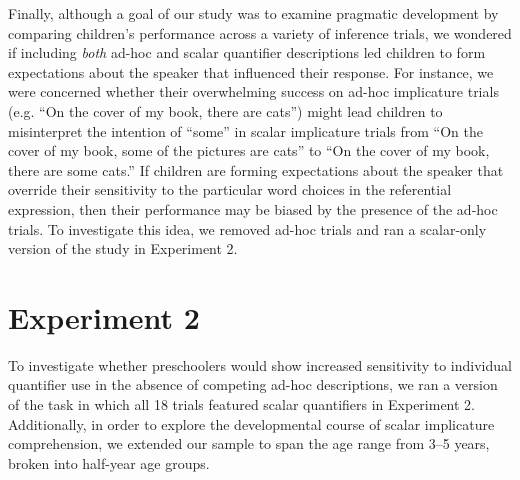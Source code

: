 \documentclass[10pt,letterpaper]{article}
\begin{document}

Finally, although a goal of our study was to examine pragmatic development by comparing children's performance across a variety of inference trials, we wondered if including \emph{both} ad-hoc and scalar quantifier descriptions led children to form expectations about the speaker that influenced their response. For instance, we were concerned whether their overwhelming success on ad-hoc implicature trials (e.g. ``On the cover of my book, there are cats'') might lead children to misinterpret the intention of ``some'' in scalar implicature trials from ``On the cover of my book, some of the pictures are cats'' to ``On the cover of my book, there are some cats.'' If children are forming expectations about the speaker that override their sensitivity to the particular word choices in the referential expression, then their performance may be biased by the presence of the ad-hoc trials.  To investigate this idea, we removed ad-hoc trials and ran a scalar-only version of the study in Experiment 2.

\section{Experiment 2} 


To investigate whether preschoolers would show increased sensitivity to individual quantifier use in the absence of competing ad-hoc descriptions, we ran a version of the task in which all 18 trials featured scalar quantifiers in Experiment 2. Additionally, in order to explore the developmental course of scalar implicature comprehension, we extended our sample to span the age range from 3--5 years, broken into half-year age groups.
\end{document}
